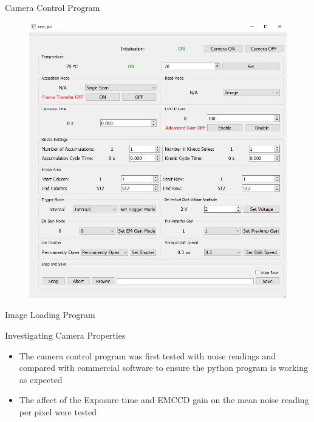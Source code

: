 \documentclass{beamer}
\begin{document}
\begin{frame}{Camera Control Program}

\begin{figure}
\centering
\includegraphics[scale=0.32]{Figures/cam_program.PNG}
\end{figure}


\end{frame}

\begin{frame}{Image Loading Program}


\begin{center}
\end{center}

\end{frame}

\begin{frame}{Investigating Camera Properties}

\begin{itemize}
\item The camera control program was first tested with noise readings and compared with commercial software to ensure the python program is working as expected
\bigskip
\item The affect of the Exposure time and EMCCD gain on the mean noise reading per pixel were tested

\end{itemize}



\end{frame}
\end{document}
